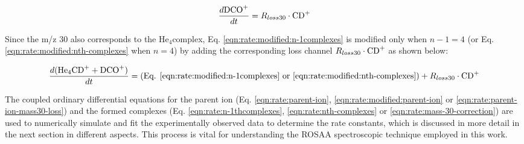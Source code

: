 \begin{equation}
    \frac{d\text{DCO}^+}{dt} = R_{loss30} \cdot \text{CD}^+
    \label{eqn:rate:mass-30-formation}
\end{equation}



Since the m/z 30 also corresponds to the He$_4$\CD complex, Eq.
\ref{eqn:rate:modified:n-1complexes} is modified only when $n-1=4$ (or Eq.
\ref{eqn:rate:modified:nth-complexes} when $n=4$) by adding the corresponding
loss channel \(R_{loss30} \cdot \text{CD}^+\) as shown below:

\begin{equation}
    \frac{d(\text{He}_4\text{CD}^+ + \text{DCO}^+)}{dt} = (\text{Eq. } \ref{eqn:rate:modified:n-1complexes} \text{ or } \ref{eqn:rate:modified:nth-complexes}) + R_{loss30} \cdot \text{CD}^+
    \label{eqn:rate:mass-30-correction}
\end{equation}

The coupled ordinary differential equations for the parent ion \CD (Eq.
\ref{eqn:rate:parent-ion}, \ref{eqn:rate:modified:parent-ion} or
\ref{eqn:rate:parent-ion-mass30-loss}) and the formed complexes (Eq.
\ref{eqn:rate:n-1thcomplexes}, \ref{eqn:rate:nth-complexes} or
\ref{eqn:rate:mass-30-correction}) are used to numerically simulate and fit the
experimentally observed data to determine the rate constants, which is
discussed in more detail in the next section in different aspects. This process
is vital for understanding the ROSAA spectroscopic technique employed in this
work.